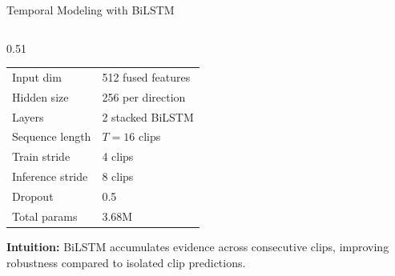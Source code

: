 \documentclass[aspectratio=169, 10pt]{beamer}
\begin{document}
\begin{frame}{Temporal Modeling with BiLSTM}
\begin{columns}[T,onlytextwidth]
\begin{column}{0.51\textwidth}
\begin{tabular}{@{}p{2.8cm}p{3.8cm}@{}}
\rowcolor{CardBlue}
Input dim & 512 fused features \\

Hidden size & 256 per direction \\

\rowcolor{CardBlue}
Layers & 2 stacked BiLSTM \\

Sequence length & $T=16$ clips \\

\rowcolor{CardBlue}
Train stride & 4 clips \\

Inference stride & 8 clips \\

\rowcolor{CardBlue}
Dropout & 0.5 \\

Total params & 3.68M \\

\bottomrule
\end{tabular}

\vspace{3pt}

\begin{tcolorbox}[
tealcard,
boxsep=2pt,
left=3pt,right=3pt,
top=3pt,bottom=3pt]

\footnotesize
\textbf{Intuition:}
BiLSTM accumulates evidence across consecutive clips, improving robustness compared to isolated clip predictions.

\end{tcolorbox}

\end{column}

\end{columns}

\end{frame}
\end{document}
